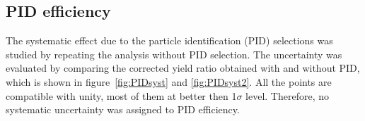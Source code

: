 \clearpage
\subsection{PID efficiency}

The systematic eﬀect due to the particle identification (PID) selections was studied by repeating the analysis without PID selection. The uncertainty was evaluated by comparing the corrected yield ratio obtained with and without PID, which is shown in figure~\ref{fig:PIDsyst} and \ref{fig:PIDsyst2}. All the points are compatible with unity, most of them at better then 1$\sigma$ level. Therefore, no systematic uncertainty was assigned to PID eﬃciency.




